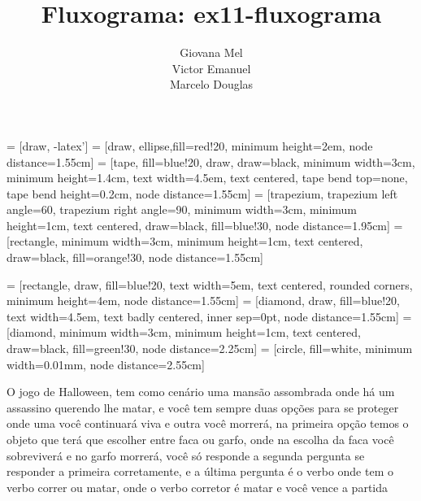 \documentclass[a4paper,12pt]{article} %
\title{Fluxograma: ex11-fluxograma}
\author{Giovana Mel \\ Victor Emanuel \\ Marcelo Douglas}
\begin{document}
\maketitle


 = [draw, -latex']
 = [draw, ellipse,fill=red!20, minimum height=2em, node distance=1.55cm]
 = [tape, fill=blue!20, draw, draw=black, minimum width=3cm, minimum height=1.4cm, text width=4.5em, text centered, tape bend top=none, tape bend height=0.2cm, node distance=1.55cm]
 = [trapezium, trapezium left angle=60, trapezium right angle=90, minimum width=3cm, minimum height=1cm, text centered, draw=black, fill=blue!30, node distance=1.95cm]
 = [rectangle, minimum width=3cm, minimum height=1cm, text centered, draw=black, fill=orange!30, node distance=1.55cm]

 = [rectangle, draw, fill=blue!20, text width=5em, text centered, rounded corners, minimum height=4em, node distance=1.55cm]
 = [diamond, draw, fill=blue!20, text width=4.5em, text badly centered, inner sep=0pt, node distance=1.55cm]
 = [diamond, minimum width=3cm, minimum height=1cm, text centered, draw=black, fill=green!30, node distance=2.25cm]
 = [circle, fill=white, minimum width=0.01mm, node distance=2.55cm]

O jogo de Halloween, tem como cenário uma mansão assombrada onde há um assassino querendo lhe matar, e você tem sempre duas opções para se proteger onde uma você continuará viva e outra você morrerá, na primeira opção temos o objeto que terá que  escolher entre  faca ou garfo, onde na escolha da faca você sobreviverá e no garfo morrerá, você só responde a segunda pergunta se responder a primeira corretamente, e a última pergunta é o verbo onde tem o verbo correr ou matar, onde o verbo corretor é matar e você vence a partida

\end{document}
